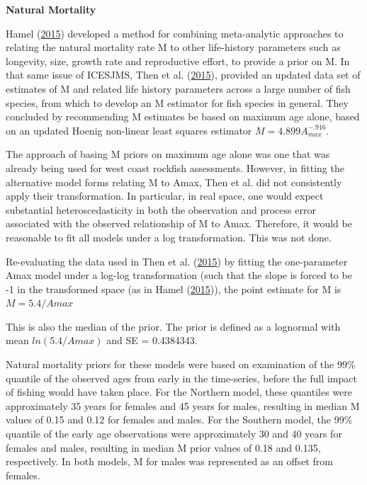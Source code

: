 \documentclass[12pt,]{article}
\begin{document}
\vspace{.5cm}

\textbf{Natural Mortality} \label{nat-mort}

Hamel (\protect\hyperlink{ref-Hamel2015}{2015}) developed a method for
combining meta-analytic approaches to relating the natural mortality
rate M to other life-history parameters such as longevity, size, growth
rate and reproductive effort, to provide a prior on M. In that same
issue of ICESJMS, Then et al. (\protect\hyperlink{ref-Then2015}{2015}),
provided an updated data set of estimates of M and related life history
parameters across a large number of fish species, from which to develop
an M estimator for fish species in general. They concluded by
recommending M estimates be based on maximum age alone, based on an
updated Hoenig non-linear least squares estimator
\(M=4.899A_{max }^{-.916}\).

The approach of basing M priors on maximum age alone was one that was
already being used for west coast rockfish assessments. However, in
fitting the alternative model forms relating M to Amax, Then et al. did
not consistently apply their transformation. In particular, in real
space, one would expect substantial heteroscedasticity in both the
observation and process error associated with the observed relationship
of M to Amax. Therefore, it would be reasonable to fit all models under
a log transformation. This was not done.

Re-evaluating the data used in Then et al.
(\protect\hyperlink{ref-Then2015}{2015}) by fitting the one-parameter
Amax model under a log-log transformation (such that the slope is forced
to be -1 in the transformed space (as in Hamel
(\protect\hyperlink{ref-Hamel2015}{2015})), the point estimate for M is
\(M=5.4/Amax\)

This is also the median of the prior. The prior is defined as a
lognormal with mean \(ln(5.4/Amax)\) and SE = 0.4384343.

Natural mortality priors for these models were based on examination of
the 99\% quantile of the observed ages from early in the time-series,
before the full impact of fishing would have taken place. For the
Northern model, these quantiles were approximately 35 years for females
and 45 years for males, resulting in median M values of 0.15 and 0.12
for females and males. For the Southern model, the 99\% quantile of the
early age observations were approximately 30 and 40 years for females
and males, resulting in median M prior values of 0.18 and 0.135,
respectively. In both models, M for males was represented as an offset
from females.
\end{document}
